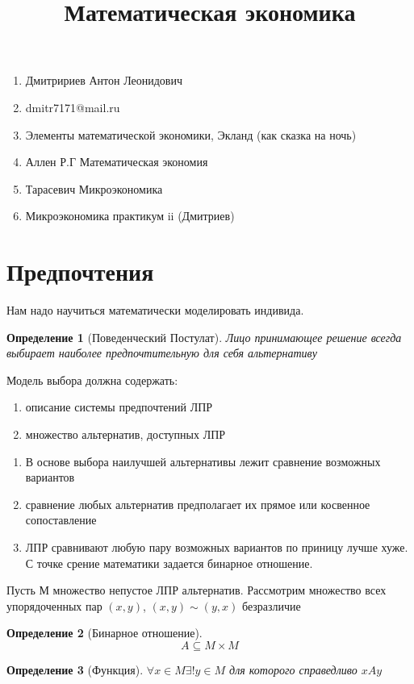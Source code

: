 \documentclass[14pt]{extarticle}
\title{Математическая экономика}
\author{}
\date{}
\newtheorem{definition}{Определение}
\begin{document}
	\maketitle
	\begin{enumerate}
		\item Дмитририев Антон Леонидович
		\item dmitr7171@mail.ru
		\item Элементы математической экономики, Экланд (как сказка на ночь)
		\item Аллен Р.Г Математическая экономия
		\item Тарасевич Микроэкономика
		\item Микроэкономика практикум ii (Дмитриев)
	\end{enumerate}
	\section{Предпочтения}
	Нам надо научиться математически
	моделировать индивида.
	\begin{definition}[Поведенческий Постулат]
		Лицо принимающее решение
		всегда выбирает наиболее предпочтительную
		для себя альтернативу
	\end{definition}
	Модель выбора должна содержать:
	\begin{enumerate}
		\item описание системы предпочтений ЛПР
		\item множество альтернатив, доступных ЛПР
	\end{enumerate}
	\begin{enumerate}
		\item В основе выбора
			наилучшей альтернативы лежит
			сравнение возможных вариантов
		\item сравнение любых
			альтернатив предполагает их прямое или
			косвенное сопоставление
		\item ЛПР сравнивают любую пару
			возможных вариантов по приницу
			лучше хуже. С точке срение математики 
			задается бинарное отношение.
	\end{enumerate}
		Пусть $М$
		множество непустое ЛПР
		альтернатив. Рассмотрим
		множество всех упорядоченных пар  $(x,y)$,
		 $(x,y) \sim (y,x)$ безразличие
	 \begin{definition}[Бинарное отношение]
		 \begin{equation} 
		 A \subseteq M \times M
		 \end{equation} 
	\end{definition}
	\begin{definition}[Функция]
		$\forall x \in M \exists ! y \in M$ для которого
		справедливо $x A y$
	\end{definition}
\end{document}
